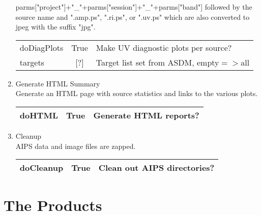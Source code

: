 \documentclass[11pt]{article}
\begin{document}
\begin{enumerate}
parms["project"]+"\_"+parms["session"]+"\_"+parms["band"]
followed by the source name and ".amp.ps",  ".ri.ps", or ".uv.ps"
which are also converted to jpeg with the suffix "jpg".
\begin{center}
\begin{tabular}{|l|c|l|}
\hline
doDiagPlots & True & Make UV diagnostic plots per source? \\
targets   & [?]   & Target list set from ASDM, empty$=>$all\\
\hline
\end{tabular}
\end{center}
%
\item Generate HTML Summary \\
Generate an HTML page with source statistics and links to the various
plots.
\begin{center}
\begin{tabular}{|l|c|l|}
\hline
doHTML  & True & Generate HTML reports? \\
\hline
\end{tabular}
\end{center}
%
\item Cleanup \\
AIPS data and image files are zapped.
\begin{center}
\begin{tabular}{|l|c|l|}
\hline
doCleanup  & True & Clean out AIPS directories? \\
\hline
\end{tabular}
\end{center}
%
\end{enumerate}

\section {The Products}\label{products}
\end{document}
